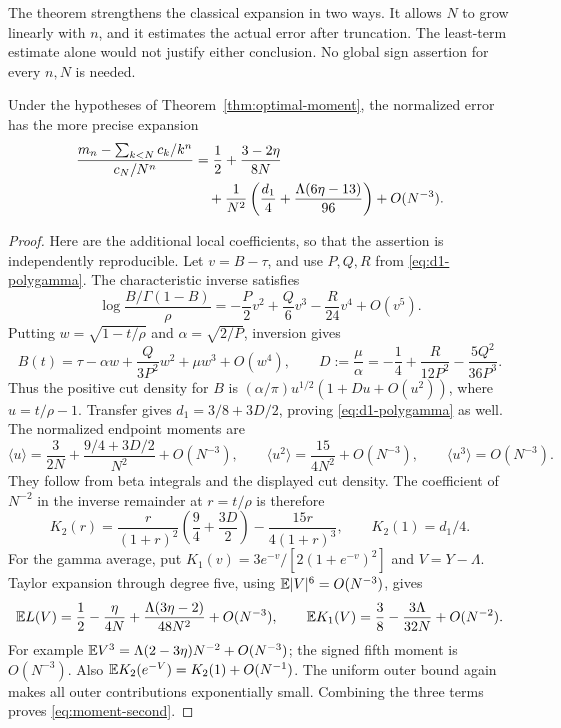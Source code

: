 The theorem strengthens the classical expansion in two ways.
It allows \(N\) to grow linearly with \(n\), and it estimates the
actual error after truncation. The least-term estimate alone would
not justify either conclusion. No global sign assertion for every
\(n,N\) is needed.

\begin{corollary}\label{cor:moment-second}
Under the hypotheses of Theorem~\ref{thm:optimal-moment}, the normalized
error has the more precise expansion
\begin{align}
 \frac{m_n-\sum_{k<N}c_k/k^n}{c_N/N^n}
 &=\frac12+\frac{3-2\eta}{8N}\notag\\
 &\quad+\frac1{N^2}
 \left(\frac{d_1}{4}+\frac{\Lambda(6\eta-13)}{96}\right)
 +O(N^{-3}).\label{eq:moment-second}
\end{align}
\end{corollary}

\begin{proof}
Here are the additional local coefficients, so that the assertion is
independently reproducible. Let \(v=B-\tau\), and use \(P,Q,R\)
from \eqref{eq:d1-polygamma}. The characteristic inverse satisfies
\[
 \log\frac{B/\Gamma(1-B)}{\rho}
 =-\frac{P}{2}v^2+\frac{Q}{6}v^3-\frac{R}{24}v^4+O(v^5).
\]
Putting \(w=\sqrt{1-t/\rho}\) and
\(\alpha=\sqrt{2/P}\), inversion gives
\[
 B(t)=\tau-\alpha w+\frac{Q}{3P^2}w^2+\mu w^3+O(w^4),
 \qquad
 D:=\frac{\mu}{\alpha}
 =-\frac14+\frac{R}{12P^2}-\frac{5Q^2}{36P^3}.
\]
Thus the positive cut density for \(B\) is
\((\alpha/\pi)u^{1/2}(1+Du+O(u^2))\), where \(u=t/\rho-1\).
Transfer gives \(d_1=3/8+3D/2\), proving
\eqref{eq:d1-polygamma} as well. The normalized endpoint moments are
\[
 \langle u\rangle=\frac{3}{2N}
       +\frac{9/4+3D/2}{N^2}+O(N^{-3}),\qquad
 \langle u^2\rangle=\frac{15}{4N^2}+O(N^{-3}),\qquad
 \langle u^3\rangle=O(N^{-3}).
\]
They follow from beta integrals and the displayed cut density.
The coefficient of \(N^{-2}\) in the inverse remainder at \(r=t/\rho\)
is therefore
\[
 K_2(r)=\frac{r}{(1+r)^2}\left(\frac94+\frac{3D}{2}\right)
                    -\frac{15r}{4(1+r)^3},\qquad K_2(1)=d_1/4.
\]
For the gamma average, put
\(K_1(v)=3e^{-v}/[2(1+e^{-v})^2]\) and \(V=Y-\Lambda\).
Taylor expansion through degree five, using
\(\mathbb E|V|^6=O(N^{-3})\), gives
\[
 \mathbb E L(V)=\frac12-\frac{\eta}{4N}
       +\frac{\Lambda(3\eta-2)}{48N^2}+O(N^{-3}),\qquad
 \mathbb E K_1(V)=\frac38-\frac{3\Lambda}{32N}+O(N^{-2}).
\]
For example \(\mathbb E V^3=\Lambda(2-3\eta)N^{-2}+O(N^{-3})\);
the signed fifth moment is \(O(N^{-3})\).
Also \(\mathbb E K_2(e^{-V})=K_2(1)+O(N^{-1})\).
The uniform outer bound again makes all outer contributions
exponentially small. Combining the three terms proves
\eqref{eq:moment-second}.
\end{proof}

